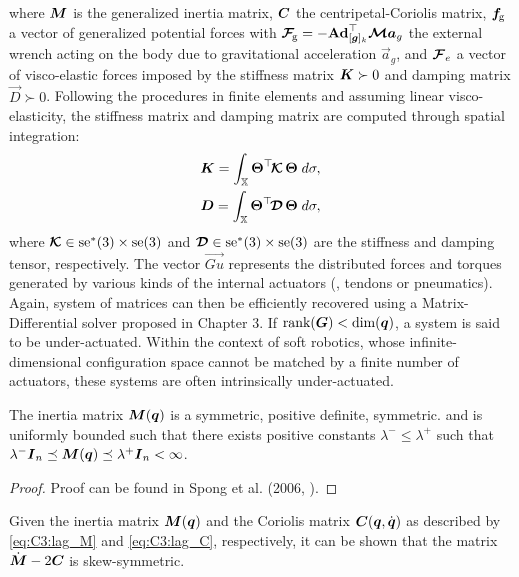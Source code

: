%
\noindent where $\boldsymbol{M}$ is the generalized inertia matrix, $\boldsymbol{C}$ the  centripetal-Coriolis matrix, ${\boldsymbol{f}}\!_{\scriptstyle\textrm{g}}$ a vector of generalized potential forces with $\boldsymbol{\mathcal{F}}\!_{\scriptstyle\textrm{g}} = -\textbf{Ad}_{[{\boldsymbol{g}}]_k}^\top \boldsymbol{\mathcal{M}} \boldsymbol{a}_g$ the external wrench acting on the body due to gravitational acceleration $\vec{a}_g$, and $\boldsymbol{\mathcal{F}}_e$ a vector of visco-elastic forces imposed by the stiffness matrix $\boldsymbol{K} \succ 0$ and damping matrix $\vec{D} \succ 0$. Following the procedures in finite elements and assuming linear visco-elasticity, the stiffness matrix and damping matrix are computed through spatial integration:
%
\begin{align}
\boldsymbol{K} = \int_{\mathbb{X}} \boldsymbol{\Theta}^\top \!\boldsymbol{\mathcal{K}}\, \boldsymbol{\Theta} \; d\sigma, \label{eq:C3:stiff_mat}\\
\boldsymbol{D} = \int_{\mathbb{X}} \boldsymbol{\Theta}^\top \!\boldsymbol{\mathcal{D}}\, \boldsymbol{\Theta} \; d\sigma, \label{eq:C3:damp_mat}
\end{align}
%
where $\boldsymbol{\mathcal{K}} \in \textup{\textrm{se}}^*(3) \times \textup{\textrm{se}}(3)$ and $\boldsymbol{\mathcal{D}} \in  \textup{\textrm{se}}^*(3) \times \textup{\textrm{se}}(3)$ are the stiffness and damping tensor, respectively. The vector $\vec{Gu}$ represents the distributed forces and torques generated by various kinds of the internal actuators (\eg, tendons or pneumatics). Again, system of matrices can then be efficiently recovered using a Matrix-Differential solver proposed in Chapter 3. If $\textnormal{rank}({\boldsymbol{G}}) < \text{dim}({\boldsymbol{q}})$, a system is said to be under-actuated. Within the context of soft robotics, whose infinite-dimensional configuration space cannot be matched by a finite number of actuators, these systems are often intrinsically under-actuated. 

\begin{lem}
  \label{lem:C3:1}
  The inertia matrix $\boldsymbol{M}(\boldsymbol{q})$ is a symmetric, positive definite, symmetric. and is uniformly bounded such that there exists positive constants $\lambda^{-} \le \lambda^{+}$ such that  $\lambda^{-} \boldsymbol{I}_{n} \preceq \boldsymbol{M}(\boldsymbol{q}) \preceq \lambda^{+} \boldsymbol{I}_{n} < \infty$.
\end{lem}

\begin{proof}
Proof can be found in Spong et al. (2006, \citep{Spong2006}).
\end{proof}

\begin{lem}
\label{lem:C3:passive}
Given the inertia matrix $\boldsymbol{M}(\boldsymbol{q})$ and the Coriolis matrix
$\boldsymbol{C}(\boldsymbol{q},\dot{\boldsymbol{q}})$ as described by \eqref{eq:C3:lag_M} and \eqref{eq:C3:lag_C}, respectively, it can be shown that the matrix $\dot{\boldsymbol{M}} - 2\boldsymbol{C}$ is skew-symmetric.
\end{lem}

